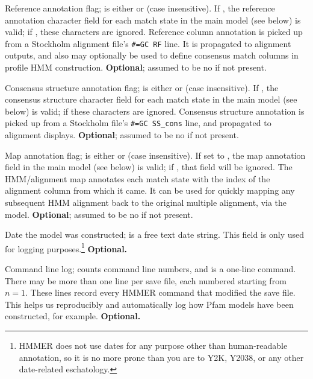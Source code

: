 \begin{sreitems}{}
\item [\emprog{RF <s>}] Reference annotation flag;  is
either  or  (case insensitive). If , the
reference annotation character field for each match state in the main
model (see below) is valid; if , these characters are
ignored.  Reference column annotation is picked up from a Stockholm
alignment file's \verb+#=GC RF+ line. It is propagated to alignment
outputs, and also may optionally be used to define consensus match
columns in profile HMM construction. \textbf{Optional}; assumed to be
no if not present.

\item [\emprog{CS <s>}] Consensus structure annotation flag;
 is either  or  (case insensitive). If
, the consensus structure character field for each match
state in the main model (see below) is valid; if  these
characters are ignored. Consensus structure annotation is picked up
from a Stockholm file's \verb+#=GC SS_cons+ line, and propagated to
alignment displays.  \textbf{Optional}; assumed to be no if not
present.

\item [\emprog{MAP <s>}] Map annotation flag;  is either
 or  (case insensitive).  If set to , the
map annotation field in the main model (see below) is valid; if
, that field will be ignored.  The HMM/alignment map
annotates each match state with the index of the alignment column from
which it came. It can be used for quickly mapping any subsequent
HMM alignment back to the original multiple alignment, via the model.
\textbf{Optional}; assumed to be no if not present.

\item [\emprog{DATE <s>}] Date the model was constructed; 
is a free text date string.  This field is only used for logging
purposes.\footnote{HMMER does not use dates for any purpose other than
human-readable annotation, so it is no more prone than you are to Y2K,
Y2038, or any other date-related eschatology.} \textbf{Optional.}

\item [\emprog{COM [<n>] <s>}] Command line log;  counts
command line numbers, and  is a one-line command. There may
be more than one  line per save file, each numbered starting
from $n=1$. These lines record every HMMER command that modified the
save file. This helps us reproducibly and automatically log how Pfam
models have been constructed, for example. \textbf{Optional.}


\end{sreitems}
